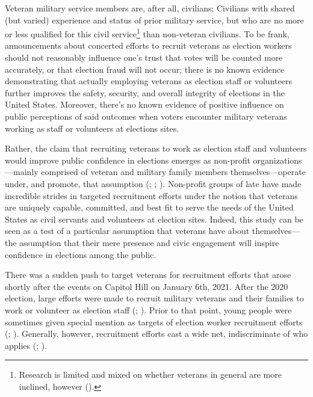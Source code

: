 \documentclass[
  12pt,
  letterpaper,
]{article}
\begin{document}
Veteran military service members are, after all, civilians; Civilians
with shared (but varied) experience and status of prior military
service, but who are no more or less qualified for this civil
service\footnote{Research is limited and mixed on whether veterans in
  general are more inclined, however ().} than non-veteran civilians. To be frank,
announcements about concerted efforts to recruit veterans as election
workers should not reasonably influence one's trust that votes will be
counted more accurately, or that election fraud will not occur; there is
no known evidence demonstrating that actually employing veterans as
election staff or volunteers further improves the safety, security, and
overall integrity of elections in the United States. Moreover, there's
no known evidence of positive influence on public perceptions of said
outcomes when voters encounter military veterans working as staff or
volunteers at elections sites.

Rather, the claim that recruiting veterans to work as election staff and
volunteers would improve public confidence in elections emerges as
non-profit organizations---mainly comprised of veteran and military
family members themselves---operate under, and promote, that assumption
(;
;
). Non-profit groups of late
have made incredible strides in targeted recruitment efforts under the
notion that veterans are uniquely capable, committed, and best fit to
serve the needs of the United States as civil servants and volunteers at
election sites. Indeed, this study can be seen as a test of a particular
assumption that veterans have about themselves---the assumption that
their mere presence and civic engagement will inspire confidence in
elections among the public.

There was a sudden push to target veterans for recruitment efforts that
arose shortly after the events on Capitol Hill on January 6th, 2021.
After the 2020 election, large efforts were made to recruit military
veterans and their families to work or volunteer as election staff
(;
). Prior to that
point, young people were sometimes given special mention as targets of
election worker recruitment efforts (; ).
Generally, however, recruitment efforts cast a wide net, indiscriminate
of who applies (;
).
\end{document}
